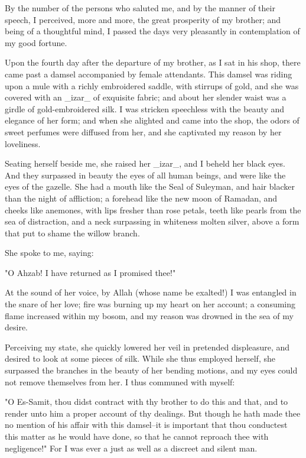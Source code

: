 By the number of the persons who saluted me, and by the manner of
their speech, I perceived, more and more, the great prosperity of
my brother; and being of a thoughtful mind, I passed the days very
pleasantly in contemplation of my good fortune.

Upon the fourth day after the departure of my brother, as I sat in his
shop, there came past a damsel accompanied by female attendants. This
damsel was riding upon a mule with a richly embroidered saddle, with
stirrups of gold, and she was covered with an _izar_ of exquisite
fabric; and about her slender waist was a girdle of gold-embroidered
silk. I was stricken speechless with the beauty and elegance of her
form; and when she alighted and came into the shop, the odors of sweet
perfumes were diffused from her, and she captivated my reason by her
loveliness.

Seating herself beside me, she raised her _izar_, and I beheld her
black eyes. And they surpassed in beauty the eyes of all human beings,
and were like the eyes of the gazelle. She had a mouth like the Seal
of Suleyman, and hair blacker than the night of affliction; a forehead
like the new moon of Ramadan, and cheeks like anemones, with lips
fresher than rose petals, teeth like pearls from the sea of
distraction, and a neck surpassing in whiteness molten silver, above
a form that put to shame the willow branch.

She spoke to me, saying:

"O Ahzab! I have returned as I promised thee!"

At the sound of her voice, by Allah (whose name be exalted!) I was
entangled in the snare of her love; fire was burning up my heart on
her account; a consuming flame increased within my bosom, and my
reason was drowned in the sea of my desire.

Perceiving my state, she quickly lowered her veil in pretended
displeasure, and desired to look at some pieces of silk. While she
thus employed herself, she surpassed the branches in the beauty of
her bending motions, and my eyes could not remove themselves from
her. I thus communed with myself:

"O Es-Samit, thou didst contract with thy brother to do this and that,
and to render unto him a proper account of thy dealings. But though
he hath made thee no mention of his affair with this damsel--it is
important that thou conductest this matter as he would have done, so
that he cannot reproach thee with negligence!" For I was ever a just
as well as a discreet and silent man.

